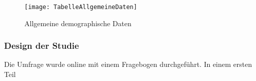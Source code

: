 \begin{figure}[htp]
\begin{center}
  \texttt{[image: TabelleAllgemeineDaten]} %
  \caption{Allgemeine demographische Daten}
  \label{fig:TabelleAllgemeineDaten}
\end{center}
\end{figure}









\subsubsection{Design der Studie}
Die Umfrage wurde online mit einem Fragebogen durchgeführt.
In einem ersten Teil